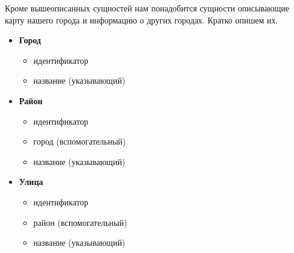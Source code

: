 \documentclass{report}
\begin{document}
Кроме вышеописанных сущностей нам понадобится сущности описывающие карту 
нашего города и информацию о других городах. Кратко опишем их.
\begin{itemize}
    \item[] \textbf{Город}
    \begin{itemize}
        \item идентификатор
        \item название (указывающий)
    \end{itemize}
    \item[] \textbf{Район}
    \begin{itemize}
        \item идентификатор
        \item город (вспомогательный)
        \item название (указывающий)
    \end{itemize} 
    \item[] \textbf{Улица}
    \begin{itemize}
        \item идентификатор
        \item район (вспомогательный)
        \item название (указывающий)
    \end{itemize} 
\end{itemize}
\end{document}
